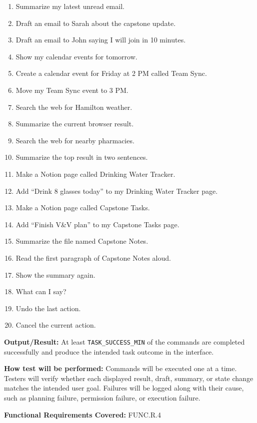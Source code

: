 \documentclass[12pt, titlepage]{article}
\begin{document}
\begin{enumerate}
{\renewcommand{\labelenumii}{\arabic{enumii}.}
\begin{enumerate}
  \item Summarize my latest unread email.
  \item Draft an email to Sarah about the capstone update.
  \item Draft an email to John saying I will join in 10 minutes.
  \item Show my calendar events for tomorrow.
  \item Create a calendar event for Friday at 2 PM called Team Sync.
  \item Move my Team Sync event to 3 PM.
  \item Search the web for Hamilton weather.
  \item Summarize the current browser result.
  \item Search the web for nearby pharmacies.
  \item Summarize the top result in two sentences.
  \item Make a Notion page called Drinking Water Tracker.
  \item Add ``Drink 8 glasses today'' to my Drinking Water Tracker page.
  \item Make a Notion page called Capstone Tasks.
  \item Add ``Finish V\&V plan'' to my Capstone Tasks page.
  \item Summarize the file named Capstone Notes.
  \item Read the first paragraph of Capstone Notes aloud.
  \item Show the summary again.
  \item What can I say?
  \item Undo the last action.
  \item Cancel the current action.
\end{enumerate}
}

\textbf{Output/Result:} At least \texttt{TASK\_SUCCESS\_MIN} of the
commands are completed successfully and produce the intended task outcome
in the interface.

\textbf{How test will be performed:} Commands will be executed one at a
time. Testers will verify whether each displayed result, draft, summary,
or state change matches the intended user goal. Failures will be logged
along with their cause, such as planning failure, permission failure, or
execution failure.

\textbf{Functional Requirements Covered:} FUNC.R.4

\end{enumerate}
\end{document}
